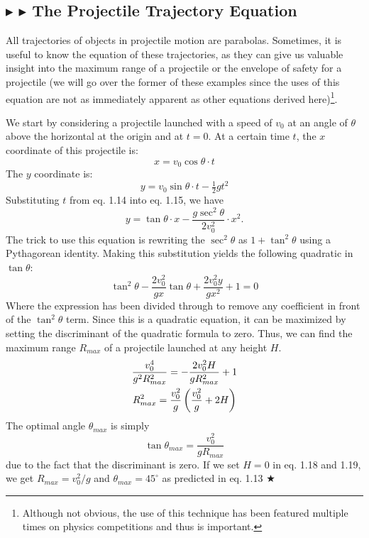 \subsection{\color{Goldenrod} $\blacktriangleright$ \color{Orchid} $\blacktriangleright$ \color{black} The Projectile Trajectory Equation}
\noindent All trajectories of objects in projectile motion are parabolas. Sometimes, it is useful to know the equation of these trajectories, as they can give us valuable insight into the maximum range of a projectile or the envelope of safety for a projectile (we will go over the former of these examples since the uses of this equation are not as immediately apparent as other equations derived here)\footnote{Although not obvious, the use of this technique has been featured multiple times on physics competitions and thus is important.}.

\noindent We start by considering a projectile launched with a speed of $v_0$ at an angle of $\theta$ above the horizontal at the origin and at $t=0$. At a certain time $t$, the $x$ coordinate of this projectile is:
\begin{equation}
    x = v_0\cos \theta \cdot t
\end{equation}
\noindent The $y$ coordinate is:
\begin{equation}
    y = v_0 \sin \theta \cdot t - \tfrac12 g t^2
\end{equation}
\noindent Substituting $t$ from eq. 1.14 into eq. 1.15, we have
\begin{equation}
    \boxed{y = \tan \theta \cdot x - \frac{g\sec^2{\theta}}{2v_0^2} \cdot x^2}.
\end{equation}
\noindent The trick to use this equation is rewriting the $\sec^2\theta$ as $1+\tan^2\theta$ using a Pythagorean identity. Making this substitution yields the following quadratic in $\tan \theta$:
\begin{equation}
    \tan^2\theta -\frac{2v_0^2}{gx}\tan\theta + \frac{2v_0^2 y}{gx^2} + 1 = 0
\end{equation}
\noindent Where the expression has been divided through to remove any coefficient in front of the $\tan^2\theta$ term.
\noindent Since this is a quadratic equation, it can be maximized by setting the discriminant of the quadratic formula to zero. Thus, we can find the maximum range $R_{max}$ of a projectile launched at any height $H$.
\begin{gather}
    \frac{v_0^4}{g^2R_{max}^2} = -\frac{2v_0^2H}{gR_{max}^2} + 1 \nonumber \\
    R_{max}^2 = \frac{v_0^2}{g}\left( \frac{v_0^2}{g} + 2H \right)
\end{gather}
\noindent The optimal angle $\theta_{max}$ is simply
\begin{equation}
    \tan\theta_{max} = \frac{v_0^2}{gR_{max}}
\end{equation}
\noindent due to the fact that the discriminant is zero. If we set $H=0$ in eq. 1.18 and 1.19, we get $R_{max} = v_0^2/g$ and $\theta_{max} = 45^{\circ}$ as predicted in eq. 1.13 $\bigstar$

